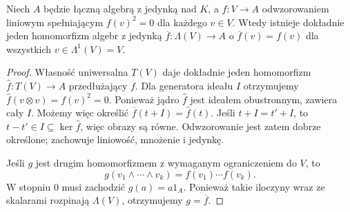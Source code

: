 \begin{twierdzenie}
\label{thm:lin10-zew-uniwersalna}
Niech \(A\) będzie łączną algebrą
z jedynką nad \(K\), a
\(f\colon V\to A\) odwzorowaniem
liniowym spełniającym
\(f(v)^2=0\) dla każdego \(v\in V\).
Wtedy istnieje dokładnie jeden
homomorfizm algebr z jedynką
\(\overline f\colon\Lambda(V)\to A\)
o \(\overline f(v)=f(v)\)
dla wszystkich \(v\in\Lambda^1(V)=V\).
\end{twierdzenie}
\begin{proof}
Własność uniwersalna \(T(V)\)
daje dokładnie jeden homomorfizm
\(\widehat f\colon T(V)\to A\)
przedłużający \(f\).
Dla generatora ideału \(I\)
otrzymujemy
\(\widehat f(v\otimes v)=f(v)^2=0\).
Ponieważ jądro \(\widehat f\)
jest ideałem obustronnym,
zawiera cały \(I\).
Możemy więc określić
\(\overline f(t+I)=\widehat f(t)\).
Jeśli \(t+I=t'+I\), to
\(t-t'\in I\subseteq\ker\widehat f\),
więc obrazy są równe.
Odwzorowanie jest zatem
dobrze określone; zachowuje
liniowość, mnożenie i jedynkę.

Jeśli \(g\) jest drugim
homomorfizmem z wymaganym
ograniczeniem do \(V\), to
\[
 g(v_1\wedge\cdots\wedge v_k)
 =f(v_1)\cdots f(v_k).
\]
W stopniu \(0\) musi zachodzić
\(g(a)=a1_A\). Ponieważ
takie iloczyny wraz ze skalarami
rozpinają \(\Lambda(V)\),
otrzymujemy \(g=\overline f\).
\end{proof}

